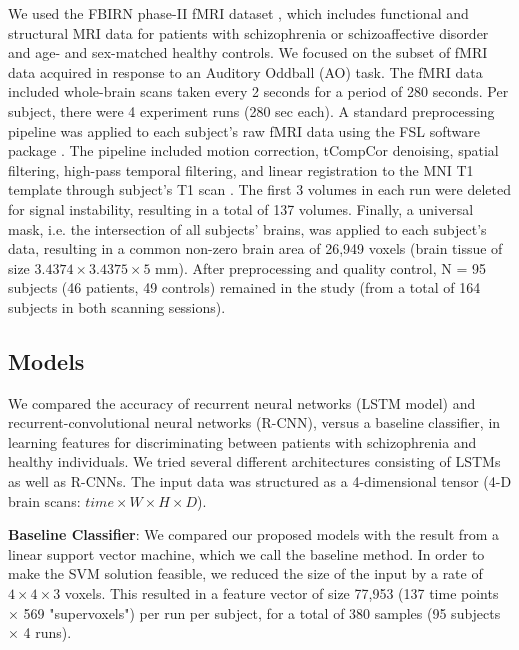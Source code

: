 \documentclass{article}
\begin{document}
We used the FBIRN phase-II fMRI dataset \citep{Keator2016}
, which includes functional and structural MRI data for patients with schizophrenia or schizoaffective disorder and age- and sex-matched healthy controls. We focused on the subset of fMRI data acquired in response to an Auditory Oddball (AO) task. 
The fMRI data included whole-brain scans taken every 2 seconds for a period of 280 seconds. Per subject, there were 4 experiment runs (280 sec each).
A standard preprocessing pipeline was applied to each subject's raw fMRI data using the FSL software package \citep{Jenkinson2012}. The pipeline included motion correction, tCompCor denoising, spatial filtering, high-pass temporal filtering, and linear registration to the MNI T1 template through subject's T1 scan \citep[see][for a more detailed description of the preprocessing stages]{Gheiratmand2017}. The first 3 volumes in each run were deleted for signal instability, resulting in a total of 137 volumes. Finally, a universal mask, i.e. the intersection of all subjects' brains, was applied to each subject's data, resulting in a common non-zero brain area of 26,949 voxels (brain tissue of size $3.4374\times3.4375\times5$ mm).
After preprocessing and quality control, N = 95 subjects (46 patients, 49 controls) remained in the study (from a total of 164 subjects in both scanning sessions).

\subsection{Models}

We compared the accuracy of recurrent neural networks (LSTM model) and recurrent-convolutional neural networks (R-CNN), versus a baseline classifier, in learning features for discriminating between patients with schizophrenia and healthy individuals. We tried several different architectures consisting of LSTMs as well as R-CNNs. The input data was structured as a 4-dimensional tensor (4-D brain scans: $time\times W\times H\times D$).

\textbf{Baseline Classifier}: We compared our proposed models with the result from a linear support vector machine, which we call the baseline method. In order to make the SVM solution feasible, we reduced the size of the input by a rate of $4\times4\times3$ voxels. This resulted in a feature vector of size 77,953 (137 time points $\times$ 569 "supervoxels") per run per subject, for a total of 380 samples (95 subjects $\times$ 4 runs).  
\end{document}
